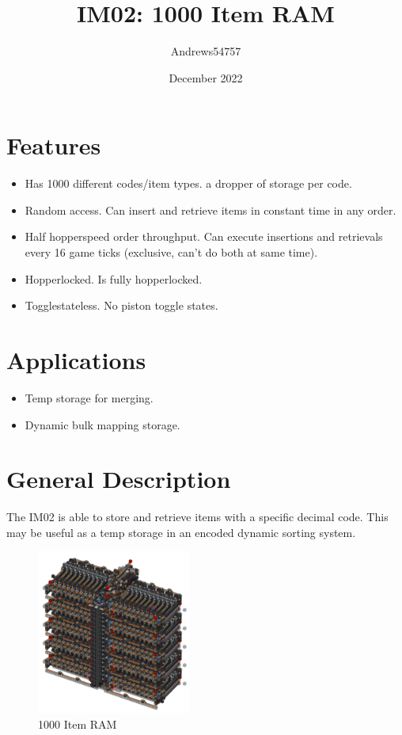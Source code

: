 \documentclass[10pt]{datasheet}
\title{IM02: 1000 Item RAM}
\author{Andrews54757}
\date{December 2022}
\begin{document}
\maketitle

\section{Features}

\begin{itemize}
\item{Has 1000 different codes/item types. a dropper of storage per code.}
\item{Random access. Can insert and retrieve items in constant time in any order.}
\item{Half hopperspeed order throughput. Can execute insertions and retrievals every 16 game ticks (exclusive, can't do both at same time).}
\item{Hopperlocked. Is fully hopperlocked.}
\item{Togglestateless. No piston toggle states.}
\end{itemize}

\section{Applications}
\begin{itemize}
\item{Temp storage for merging.}
\item{Dynamic bulk mapping storage.}
\end{itemize}

\section{General Description}
The IM02 is able to store and retrieve items with a specific decimal code. This may be useful as a temp storage in an encoded dynamic sorting system.
\vfill\break

\begin{figure}[h]
    \includegraphics[width=0.45\textwidth]{ram2.png}
    \caption{1000 Item RAM}
\end{figure}
\end{document}
